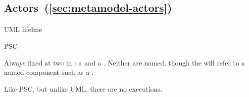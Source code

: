 \subsection{Actors~(\ref{sec:metamodel-actors})}

\paragraph{\mactor}
\begin{featset}
\item[UML] lifeline
\item[PSC] 
\end{featset}

Always fixed at two in \langname: a \mtarget{} and a \mworld{}.
Neither are named, though the \mtarget{} will refer to a
named component such as a \mrcmodule.

Like PSC, but unlike UML, there are no executions.


